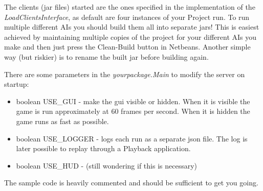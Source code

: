 \documentclass[10pt,a4paper]{article}
\begin{document}
The clients (jar files) started are the ones specified in the implementation of the \textit{LoadClientsInterface}, as default are four instances of your Project run. To run multiple different AIs you should build them all into separate jars! This is easiest achieved by maintaining multiple copies of the project for your different AIs you make and then just press the Clean-Build button in Netbeans. Another simple way (but riskier) is to rename the built jar before building again.

\vspace{0.3cm}

There are some parameters in the \textit{yourpackage.Main} to modify the server on startup:
\begin{itemize}

\item boolean USE\_GUI - make the gui visible or hidden. When it is visible the game is run approximately at 60 frames per second. When it is hidden the game runs as fast as possible.

\item boolean USE\_LOGGER - logs each run as a separate json file. The log is later possible to replay through a Playback application.

\item boolean USE\_HUD - (still wondering if this is necessary)


\end{itemize}

The sample code is heavily commented and should be sufficient to get you going.
\end{document}
